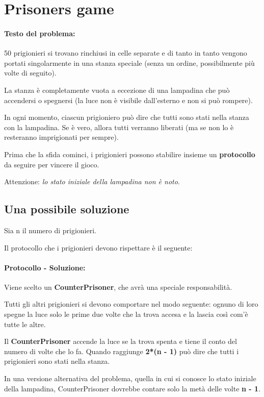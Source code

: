 \newpage
\section{Prisoners game}

\paragraph{Testo del problema:}
50 prigionieri si trovano rinchiusi in celle separate e di tanto in tanto
vengono portati singolarmente in una stanza speciale (senza un ordine,
possibilmente più volte di seguito).

La stanza è completamente vuota a eccezione di una lampadina che può accendersi
o spegnersi (la luce non è visibile dall'esterno e non si può rompere).

In ogni momento, ciascun prigioniero può dire che tutti sono stati nella stanza
con la lampadina. Se è vero, allora tutti verranno liberati (ma se non lo è
resteranno imprigionati per sempre).

Prima che la sfida cominci, i prigionieri possono stabilire insieme un
\textbf{protocollo} da seguire per vincere il gioco.

Attenzione: \textit{lo stato iniziale della lampadina non è noto}.

\subsection{Una possibile soluzione}

Sia n il numero di prigionieri.

Il protocollo che i prigionieri devono rispettare è il seguente:

\paragraph{Protocollo - Soluzione:}

Viene scelto un \textbf{CounterPrisoner}, che avrà una speciale responsabilità.

Tutti gli altri prigionieri si devono comportare nel modo seguente: ognuno di
loro spegne la luce solo le prime due volte che la trova accesa e la lascia
così com'è tutte le altre.

Il \textbf{CounterPrisoner} accende la luce se la trova spenta e tiene il conto
del numero di volte che lo fa. Quando raggiunge \textbf{2*(n - 1)} può dire che tutti
i prigionieri sono stati nella stanza.

In una versione alternativa del problema, quella in cui si conosce lo stato
iniziale della lampadina, CounterPrisoner dovrebbe contare solo la metà
delle volte \textbf{n - 1}.

